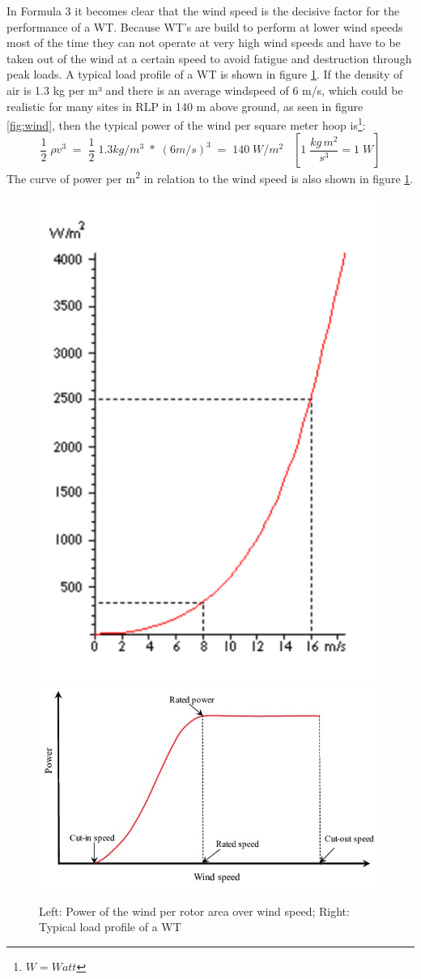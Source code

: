 \documentclass[a4paper,11pt]{article}
\begin{document}
In Formula 3 it becomes clear that the wind speed is the decisive factor for the performance of a WT. Because WT's are build to perform at lower wind speeds most of the time they can not operate at very high wind speeds and have to be taken out of the wind at a certain speed to avoid fatigue and destruction through peak loads. A typical load profile of a WT is shown in figure \ref{fig:powerofwind}. If the density of air is 1.3 kg per m³ and there is an average windspeed of 6 m/s, which could be realistic for many sites in RLP in 140 m above ground, as seen in figure \ref{fig:wind}, then the typical power of the wind per square meter hoop is\footnote{\(W= Watt\)}:
\begin{equation}
\frac{1}{2}\; \rho v^3\;=\;\frac{1}{2}\;1.3 kg/m^3\; *\; (6 m/s)^3\;=\;140\; W/m^2\;\;\; [1\; \frac{kg\, m^2}{s^3} = 1\; W]
\end{equation}
The curve of power per m\textsuperscript{2} in relation to the wind speed is also shown in figure \ref{fig:powerofwind}.
\begin{figure}

{\centering \includegraphics[width=0.49\linewidth,height=0.25\textheight]{figures/power2} \includegraphics[width=0.49\linewidth,height=0.25\textheight]{figures/Typical-wind-power-output-versus-wind-speed_W640} 

}

\caption{Left: Power of the wind per rotor area over wind speed; Right: Typical load profile of a WT}\label{fig:powerofwind}
\end{figure}
\end{document}
